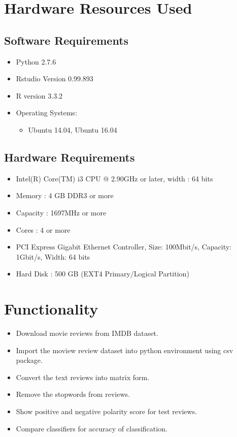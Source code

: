 \documentclass[oneside,a4paper,12pt]{pictreport}
\begin{document}
\section{Hardware Resources Used}
\subsection{Software Requirements}
\begin{itemize}
				\item Python 2.7.6 
				\item Rstudio Version 0.99.893 
				\item R version 3.3.2
				\item Operating Systems:
					\begin{itemize}
						
						\item Ubuntu 14.04, Ubuntu 16.04
						
					\end{itemize}
\end{itemize}
\subsection{Hardware Requirements}
			\begin{itemize}
				\item Intel(R) Core(TM) i3 CPU @ 2.90GHz or later, width : 64 bits
				\item Memory : 4 GB DDR3 or more
				\item Capacity : 1697MHz or more
				\item Cores : 4 or more
				\item PCI Express Gigabit Ethernet Controller, Size: 100Mbit/s, Capacity: 1Gbit/s, Width: 64 bits
				\item Hard Disk : 500 GB (EXT4 Primary/Logical Partition)
			\end{itemize}
		
\newpage

\section{Functionality}
\begin{itemize}
\item Download movie reviews from IMDB dataset.
\item Import the moview review dataset into python environment using csv package.

\item Convert the text reviews into matrix form.
\item Remove the stopwords from reviews.
\item Show positive and negative polarity score for test reviews.


\item Compare classifiers for accuracy of classification.
\end{itemize} 
\end{document}
